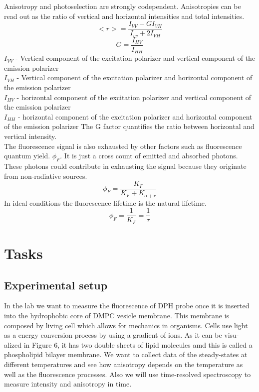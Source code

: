 \documentclass{article}
\begin{document}
Anisotropy and photoselection are strongly codependent. Anisotropies can be read out as the ratio of vertical and horizontal intensities and total intensities.
\begin{equation}
    <r> = \frac{I_{VV} - G I_{VH}}{I_{vv}+2 I_{VH}}
\end{equation}
\begin{equation}
    G = \frac{I_{HV}}{I_{HH}}
\end{equation}
$I_{VV}$ - Vertical component of the excitation polarizer and vertical component of the emission polarizer \\
$I_{VH}$ - Vertical component of the excitation polarizer and horizontal component of the emission polarizer \\
$I_{HV}$ - horizontal component of the excitation polarizer and vertical component of the emission polarizer \\
$I_{HH}$ - horizontal component of the excitation polarizer and horizontal component of the emission polarizer
The G factor quantifies the ratio between horizontal and vertical intensity.  \\
The fluorescence signal is also exhausted by other factors such as fluorescence quantum yield. $\phi_{F}$. It is just a cross count of emitted and absorbed photons. These photons could contribute in exhausting the signal because they originate from non-radiative sources.
\begin{equation}
    \phi_F = \frac{K_F}{K_F + K_{\alpha + r}}
\end{equation}
In ideal conditions the fluorescence lifetime is the natural lifetime.
\begin{equation}
    \phi_F = \frac{1}{K_F} = \frac{1}{\tau}
\end{equation}


\section{Tasks}
\subsection{Experimental setup}
In the lab we want to measure the fluorescence of DPH probe once it is inserted into the hydrophobic core of DMPC vesicle membrane. This membrane is composed by 
living cell which allows for  mechanics in organisms. Cells use light as a energy conversion process by using a gradient of ions. As it can be visu- 
alized in Figure 6, it has two double sheets of lipid molecules amd this is called a phospholipid bilayer membrane. We want to collect data of the
steady-states at different temperatures and see how anisotropy depends on the temperature as well as the fluorescence processes. Also we will use time-resolved  spectroscopy to measure intensity and anisotropy in time.
\end{document}

